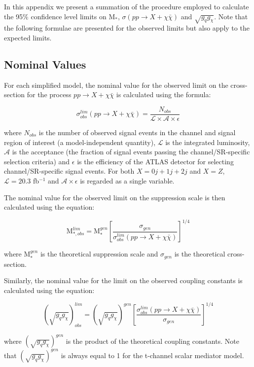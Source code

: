\begin{flushleft}
In this appendix we present a summation of the procedure employed to calculate the 95\% confidence level limits on M$_{*}$, $\sigma(pp \rightarrow X + \chi\bar{\chi})$ and $\sqrt{g_{q}g_{\chi}}$. Note that the following formulae are presented for the observed limits but also apply to the expected limits.
\end{flushleft}

\subsection{Nominal Values}
\begin{flushleft}
For each simplified model, the nominal value for the observed limit on the cross-section for the process $pp \rightarrow X + \chi\bar{\chi}$ is calculated using the formula:

\begin{equation}
\label{sigma_nom}
\sigma_{obs}^{lim}(pp \rightarrow X + \chi\bar{\chi}) = \frac{N_{obs}}{\mathcal{L}\times\mathcal{A}\times\epsilon}
\end{equation}

where $N_{obs}$ is the number of observed signal events in the channel and signal region of interest (a model-independent quantity), $\mathcal{L}$ is the integrated luminosity, $\mathcal{A}$ is the acceptance (the fraction of signal events passing the channel/SR-specific selection criteria) and $\epsilon$ is the efficiency of the ATLAS detector for selecting channel/SR-specific signal events. For both $X=0j +1j + 2j$ and $X=Z$, $\mathcal{L}=20.3$ fb$^{-1}$ and $\mathcal{A}\times\epsilon$ is regarded as a single variable.
\bigskip

The nominal value for the observed limit on the suppression scale is then calculated using the equation:

\begin{equation}
\label{M_*_nom}
\mbox{M}_{*, obs}^{lim} = \mbox{M}_{*}^{gen}\left[\frac{\sigma_{gen}}{\sigma_{obs}^{lim}(pp \rightarrow X + \chi\bar{\chi})}\right]^{1/4}
\end{equation}

where M$_{*}^{gen}$ is the theoretical suppression scale and $\sigma_{gen}$ is the theoretical cross-section.
\bigskip

Similarly, the nominal value for the limit on the observed coupling constants is calculated using the equation:

\begin{equation}
\label{coupling_nom}
(\sqrt{g_{q}g_{\chi}})_{obs}^{lim} = (\sqrt{g_{q}g_{\chi}})^{gen}\left[\frac{\sigma_{obs}^{lim}(pp \rightarrow X + \chi\bar{\chi})}{\sigma_{gen}}\right]^{1/4}
\end{equation}

where $(\sqrt{g_{q}g_{\chi}})^{gen}$ is the product of the theoretical coupling constants. Note that $(\sqrt{g_{q}g_{\chi}})^{gen}$ is always equal to 1 for the t-channel scalar mediator model. 
\end{flushleft}

